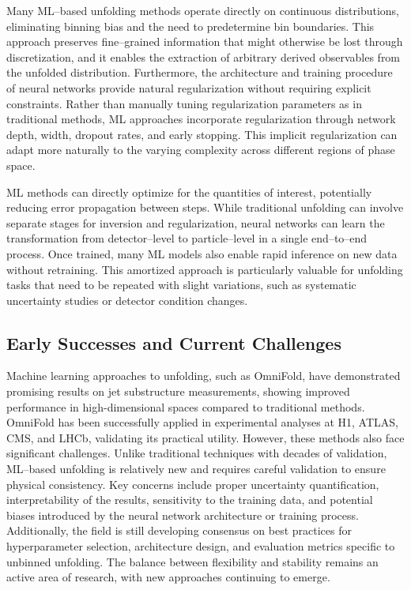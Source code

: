 Many ML--based unfolding methods operate directly on continuous distributions, eliminating binning bias and the need to predetermine bin boundaries.
%
This approach preserves fine--grained information that might otherwise be lost through discretization, and it enables the extraction of arbitrary derived observables from the unfolded distribution.\kd{}
%
Furthermore, the architecture and training procedure of neural networks provide natural regularization without requiring explicit constraints.
%
Rather than manually tuning regularization parameters as in traditional methods, ML approaches incorporate regularization through network depth, width, dropout rates, and early stopping.\kd{}
%
This implicit regularization can adapt more naturally to the varying complexity across different regions of phase space.

ML methods can directly optimize for the quantities of interest, potentially reducing error propagation between steps.
%
While traditional unfolding can involve separate stages for inversion and regularization, neural networks can learn the transformation from detector--level to particle--level in a single end--to--end process.\kd{}
%
Once trained, many ML models also enable rapid inference on new data without retraining.
%
This amortized approach is particularly valuable for unfolding tasks that need to be repeated with slight variations, such as systematic uncertainty studies or detector condition changes.\kd{}
\subsection{Early Successes and Current Challenges}
Machine learning approaches to unfolding, such as OmniFold\kd{}, have demonstrated promising results on jet substructure measurements, showing improved performance in high-dimensional spaces compared to traditional methods.
%
OmniFold has been successfully applied in experimental analyses at H1\kd{}, ATLAS\kd{}, CMS\kd{}, and LHCb\kd{}, validating its practical utility.
%
However, these methods also face significant challenges.
%
Unlike traditional techniques with decades of validation, ML--based unfolding is relatively new and requires careful validation to ensure physical consistency.
%
Key concerns include proper uncertainty quantification, interpretability of the results, sensitivity to the training data, and potential biases introduced by the neural network architecture or training process.\kd{}
%
Additionally, the field is still developing consensus on best practices for hyperparameter selection, architecture design, and evaluation metrics specific to unbinned unfolding.
%
The balance between flexibility and stability remains an active area of research, with new approaches continuing to emerge.\kd{}

